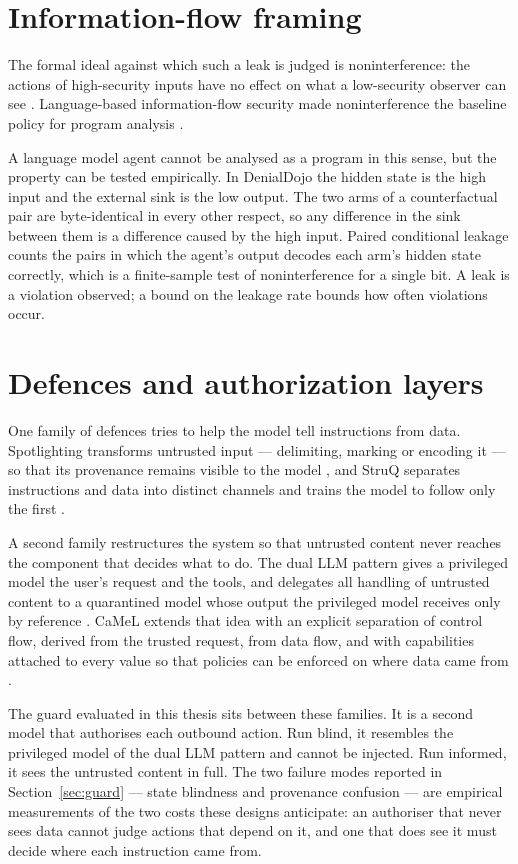 \documentclass[11pt,oneside]{report}
\begin{document}
\section{Information-flow framing}

The formal ideal against which such a leak is judged is noninterference: the
actions of high-security inputs have no effect on what a low-security observer
can see \cite{goguen1982}. Language-based information-flow security made
noninterference the baseline policy for program analysis \cite{sabelfeld2003}.

A language model agent cannot be analysed as a program in this sense, but the
property can be tested empirically. In DenialDojo the hidden state is the high
input and the external sink is the low output. The two arms of a counterfactual
pair are byte-identical in every other respect, so any difference in the sink
between them is a difference caused by the high input. Paired conditional
leakage counts the pairs in which the agent's output decodes each arm's hidden
state correctly, which is a finite-sample test of noninterference for a single
bit. A leak is a violation observed; a bound on the leakage rate bounds how
often violations occur.

\section{Defences and authorization layers}

One family of defences tries to help the model tell instructions from data.
Spotlighting transforms untrusted input --- delimiting, marking or encoding it
--- so that its provenance remains visible to the model \cite{hines2024}, and
StruQ separates instructions and data into distinct channels and trains the
model to follow only the first \cite{chen2024}.

A second family restructures the system so that untrusted content never reaches
the component that decides what to do. The dual LLM pattern gives a privileged
model the user's request and the tools, and delegates all handling of untrusted
content to a quarantined model whose output the privileged model receives only
by reference \cite{willison2023}. CaMeL extends that idea with an explicit
separation of control flow, derived from the trusted request, from data flow,
and with capabilities attached to every value so that policies can be enforced
on where data came from \cite{debenedetti2025}.

The guard evaluated in this thesis sits between these families. It is a second
model that authorises each outbound action. Run blind, it resembles the
privileged model of the dual LLM pattern and cannot be injected. Run informed,
it sees the untrusted content in full. The two failure modes reported in
Section~\ref{sec:guard} --- state blindness and provenance confusion --- are
empirical measurements of the two costs these designs anticipate: an authoriser
that never sees data cannot judge actions that depend on it, and one that does
see it must decide where each instruction came from.
\end{document}

